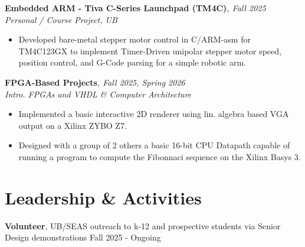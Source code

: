 \documentclass[10pt, letterpaper]{article}
\newcommand{\entry}[4]{%
  \noindent
  \textbf{#1}\hfill\textit{#3, #4}\\
  \textit{#2}
  \vspace{2pt}
}
\begin{document}
\vspace{4pt}

\entry
{Embedded ARM - Tiva C-Series Launchpad (TM4C)}
{Personal / Course Project, UB}
{}
{Fall 2025}
\begin{itemize}
	\item Developed bare-metal stepper motor control in C/ARM-asm for TM4C123GX to implement Timer-Driven unipolar stepper motor speed, position control, and G-Code parsing for a simple robotic arm.
\end{itemize}

\vspace{4pt}

\entry
{FPGA-Based Projects}
{Intro. FPGAs and VHDL \& Computer Architecture}
{}
{Fall 2025, Spring 2026}
\begin{itemize}
	\item Implemented a basic interactive 2D renderer using lin. algebra based VGA output on a Xilinx ZYBO Z7.
	\item Designed with a group of 2 others a basic 16-bit CPU Datapath capable of running a program to compute the Fibonnaci sequence on the Xilinx Basys 3.
\end{itemize}

\vspace{4pt}

\section{Leadership \& Activities}

\noindent\textbf{Volunteer}, UB/SEAS outreach to k-12 and prospective students via Senior Design demonstrations
\hfill Fall 2025 - Ongoing
\end{document}
